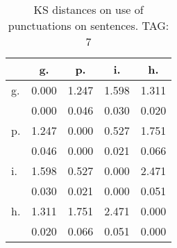 \begin{table}[h!]
\begin{center}
\begin{tabular}{| l | c | c | c | c |}\hline
 & g. & p. & i. & h. \\\hline
g. & 0.000  & 1.247  & 1.598  & 1.311 \\\hline
 & 0.000  & 0.046  & 0.030  & 0.020 \\\hline
p. & 1.247  & 0.000  & 0.527  & 1.751 \\\hline
 & 0.046  & 0.000  & 0.021  & 0.066 \\\hline
i. & 1.598  & 0.527  & 0.000  & 2.471 \\\hline
 & 0.030  & 0.021  & 0.000  & 0.051 \\\hline
h. & 1.311  & 1.751  & 2.471  & 0.000 \\\hline
 & 0.020  & 0.066  & 0.051  & 0.000 \\\hline
\end{tabular}
\caption{KS distances on use of punctuations on sentences. TAG: 7}
\end{center}
\end{table}